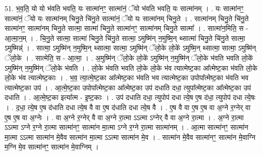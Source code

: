 \documentclass[17pt]{extarticle}
\begin{document}
51. भ॒व॒ति॒ यो यो भ॑वति भवति॒ यः सात्मा॑नꣳ॒॒ सात्मा॑नं॒ ॅयो भ॑वति भवति॒ यः सात्मा॑नम् । . यः सात्मा॑नꣳ॒॒ सात्मा॑नं॒ ॅयो यः सात्मा॑नम् चिनु॒ते चि॑नु॒ते सात्मा॑नं॒ ॅयो यः सात्मा॑नम् चिनु॒ते । . सात्मा॑नम् चिनु॒ते चि॑नु॒ते सात्मा॑नꣳ॒॒ सात्मा॑नम् चिनु॒ते सात्मा॒ सात्मा॑ चिनु॒ते सात्मा॑नꣳ॒॒ सात्मा॑नम् चिनु॒ते सात्मा᳚ । . सात्मा॑न॒मिति॒ स - आ॒त्मा॒न॒म् । . चि॒नु॒ते सात्मा॒ सात्मा॑ चिनु॒ते चि॑नु॒ते सात्मा॒ ऽमुष्मि॑न् न॒मुष्मि॒न् थ्सात्मा॑ चिनु॒ते चि॑नु॒ते सात्मा॒ ऽमुष्मिन्न्॑ । . सात्मा॒ ऽमुष्मि॑न् न॒मुष्मि॒न् थ्सात्मा॒ सात्मा॒ ऽमुष्मि॑न् ॅलो॒के लो॒के॑ ऽमुष्मि॒न् थ्सात्मा॒ सात्मा॒ ऽमुष्मि॑न् ॅलो॒के । . सात्मेति॒ स - आ॒त्मा॒ । . अ॒मुष्मि॑न् ॅलो॒के लो॒के॑ ऽमुष्मि॑न् न॒मुष्मि॑न् ॅलो॒के भ॑वति भवति लो॒के॑ ऽमुष्मि॑न् न॒मुष्मि॑न् ॅलो॒के भ॑वति । . लो॒के भ॑वति भवति लो॒के लो॒के भ॑व त्यात्मेष्ट॒का आ᳚त्मेष्ट॒का भ॑वति लो॒के लो॒के भ॑व त्यात्मेष्ट॒काः । . भ॒व॒ त्या॒त्मे॒ष्ट॒का आ᳚त्मेष्ट॒का भ॑वति भव त्यात्मेष्ट॒का उपोपा᳚त्मेष्ट॒का भ॑वति भव त्यात्मेष्ट॒का उप॑ । . आ॒त्मे॒ष्ट॒का उपोपा᳚त्मेष्ट॒का आ᳚त्मेष्ट॒का उप॑ दधाति दधा॒ त्युपा᳚त्मेष्ट॒का आ᳚त्मेष्ट॒का उप॑ दधाति । . आ॒त्मे॒ष्ट॒का इत्या᳚त्म - इ॒ष्ट॒काः । . उप॑ दधाति दधा॒ त्युपोप॑ दधा त्ये॒ष ए॒ष द॑धा॒ त्युपोप॑ दधा त्ये॒षः । . द॒धा॒ त्ये॒ष ए॒ष द॑धाति दधा त्ये॒ष वै वा ए॒ष द॑धाति दधा त्ये॒ष वै । . ए॒ष वै वा ए॒ष ए॒ष वा अ॒ग्ने र॒ग्नेर् वा ए॒ष ए॒ष वा अ॒ग्नेः । . वा अ॒ग्ने र॒ग्नेर् वै वा अ॒ग्ने रा॒त्मा ऽऽत्मा ऽग्नेर् वै वा अ॒ग्ने रा॒त्मा । . अ॒ग्ने रा॒त्मा ऽऽत्मा ऽग्ने र॒ग्ने रा॒त्मा सात्मा॑नꣳ॒॒ सात्मा॑न मा॒त्मा ऽग्ने र॒ग्ने रा॒त्मा सात्मा॑नम् । . आ॒त्मा सात्मा॑नꣳ॒॒ सात्मा॑न मा॒त्मा ऽऽत्मा सात्मा॑न मे॒वैव सात्मा॑न मा॒त्मा ऽऽत्मा सात्मा॑न मे॒व । . सात्मा॑न मे॒वैव सात्मा॑नꣳ॒॒ सात्मा॑न मे॒वाग्नि म॒ग्नि मे॒व सात्मा॑नꣳ॒॒ सात्मा॑न मे॒वाग्निम् । \newline
\end{document}
